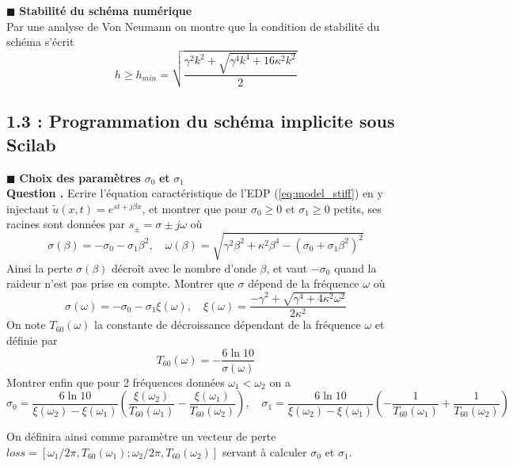 \documentclass[a4,12pt]{article}
\newcounter{Nbquestion}
\newcommand*\question{%
\stepcounter{Nbquestion}%
\textbf{Question \theNbquestion. }}
\begin{document}

  \hspace{0.5cm} $\blacksquare$ \textbf{Stabilité du schéma numérique} \\

  Par une analyse de Von Neumann on montre que la condition de stabilité du schéma s'écrit 
  \[
    h\geqslant h_{min}=\sqrt{\frac{\gamma^2k^2+\sqrt{\gamma^4 k^4+16\kappa^2 k^2}}{2}}
  \]

  \subsection*{1.3 : Programmation du schéma implicite sous Scilab}

  \hspace{0.5cm} $\blacksquare$ \textbf{Choix des paramètres} $\sigma_0$  \textbf{et}  $\sigma_1$\\


  \question Ecrire l'équation caractéristique de l'EDP (\ref{eq:model_stiff}) en y injectant $\tilde u(x,t)=e^{st+j\beta x}$, et montrer que pour $\sigma_0\geqslant 0$ et $\sigma_1\geqslant 0$ petits, ses racines sont données par $s_{\pm}=\sigma\pm j\omega$ où 
  \[
    \sigma(\beta)=-\sigma_0-\sigma_1\beta^2,\quad \omega(\beta)=\sqrt{\gamma^2 \beta^2+\kappa^2\beta^4-(\sigma_0+\sigma_1\beta^2)^2}
  \]
  Ainsi la perte $\sigma(\beta)$ décroît avec le nombre d'onde $\beta$, et vaut $-\sigma_0$ quand la raideur n'est pas prise en compte.  Montrer que $\sigma$ dépend de la fréquence $\omega$ où 
  \[
    \sigma(\omega)=-\sigma_0-\sigma_1\xi (\omega),\quad \xi(\omega)=\frac{-\gamma^2+\sqrt{\gamma^4+4\kappa^2 \omega^2}}{2\kappa^2}
  \]
  On note $T_{60}(\omega)$ la constante de décroissance dépendant de la fréquence $\omega$ et définie par 
  \[
    T_{60}(\omega)=-\frac{6\ln 10}{\sigma(\omega)}
  \]
  Montrer enfin que pour 2 fréquences données $\omega_1<\omega_2$ on a 
  \[
    \sigma_0=\frac{6 \ln 10}{\xi(\omega_2)-\xi(\omega_1)}\left(\frac{\xi(\omega_2)}{T_{60}(\omega_1)}-\frac{\xi(\omega_1)}{T_{60}(\omega_2)}\right), \quad \sigma_1=\frac{6 \ln 10}{\xi(\omega_2)-\xi(\omega_1)}\left(-\frac{1}{T_{60}(\omega_1)}+\frac{1}{T_{60}(\omega_2)}\right)
  \]


  On définira ainsi comme paramètre un vecteur de perte $loss=[\omega_1/2\pi,T_{60}(\omega_1) ; \omega_2/2\pi,T_{60}(\omega_2)]$ servant à calculer $\sigma_0$ et $\sigma_1$. \\
\end{document}
